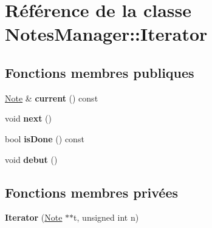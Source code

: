 \hypertarget{class_notes_manager_1_1_iterator}{\section{Référence de la classe Notes\-Manager\-:\-:Iterator}
\label{class_notes_manager_1_1_iterator}
}
\subsection*{Fonctions membres publiques}
\begin{DoxyCompactItemize}
\item 
\hypertarget{class_notes_manager_1_1_iterator_a08d0d561704a142e828416b39bbf1ccd}{\hyperlink{class_note}{Note} \& {\bfseries current} () const }\label{class_notes_manager_1_1_iterator_a08d0d561704a142e828416b39bbf1ccd}

\item 
\hypertarget{class_notes_manager_1_1_iterator_a1a79699fe56e691c3f1c72eb46703fc6}{void {\bfseries next} ()}\label{class_notes_manager_1_1_iterator_a1a79699fe56e691c3f1c72eb46703fc6}

\item 
\hypertarget{class_notes_manager_1_1_iterator_aca3037c7eac946bd34a98decb8f41051}{bool {\bfseries is\-Done} () const }\label{class_notes_manager_1_1_iterator_aca3037c7eac946bd34a98decb8f41051}

\item 
\hypertarget{class_notes_manager_1_1_iterator_a154ce8a4147ee99e2dcf93972a448fae}{void {\bfseries debut} ()}\label{class_notes_manager_1_1_iterator_a154ce8a4147ee99e2dcf93972a448fae}

\end{DoxyCompactItemize}
\subsection*{Fonctions membres privées}
\begin{DoxyCompactItemize}
\item 
\hypertarget{class_notes_manager_1_1_iterator_afb5a2182e04da56b1a0ddf3678b1c7c3}{{\bfseries Iterator} (\hyperlink{class_note}{Note} $\ast$$\ast$t, unsigned int n)}\label{class_notes_manager_1_1_iterator_afb5a2182e04da56b1a0ddf3678b1c7c3}

\end{DoxyCompactItemize}
